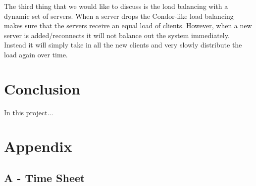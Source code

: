 \documentclass[a4paper,10pt]{article}
\begin{document}
The third thing that we would like to discuss is the load balancing with a dynamic set of servers.
When a server drops the Condor-like load balancing makes sure that the servers receive an equal load of clients.
However, when a new server is added/reconnects it will not balance out the system immediately.
Instead it will simply take in all the new clients and very slowly distribute the load again over time.

\section{Conclusion}
\label{sec:conclusion}
In this project...

\newpage
\section*{Appendix}

\subsection*{A - Time Sheet}
\label{sec:appendix}



\end{document}

